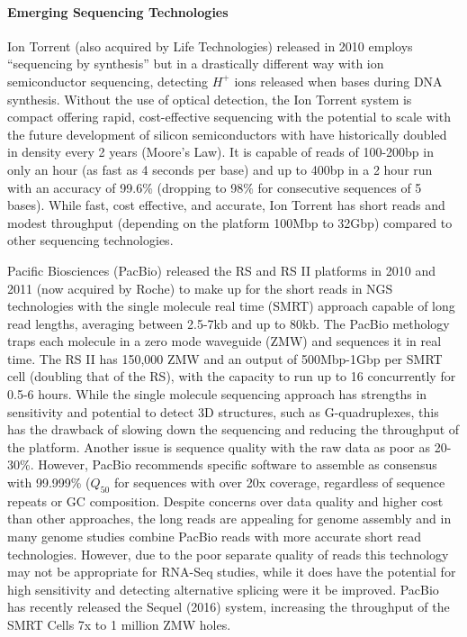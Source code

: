 \paragraph{Emerging Sequencing Technologies}

Ion Torrent (also acquired by Life Technologies) released in 2010 employs ``sequencing by synthesis'' but in a drastically different way with ion semiconductor sequencing, detecting $H^+$ ions released when bases during DNA synthesis. Without the use of optical detection, the Ion Torrent system is compact offering rapid, cost-effective sequencing with the potential to scale with the future development of silicon semiconductors with have historically doubled in density every 2 years (Moore's Law). It is capable of reads of 100-200bp in only an hour (as fast as 4 seconds per base) and up to 400bp in a 2 hour run with an accuracy of 99.6\% (dropping to 98\% for consecutive sequences of 5 bases). While fast, cost effective, and accurate, Ion Torrent has short reads and modest throughput (depending on the platform 100Mbp to 32Gbp) compared to other sequencing technologies.

Pacific Biosciences (PacBio) released the RS and RS II platforms in 2010 and 2011 (now acquired by Roche) to make up for the short reads in NGS technologies with the single molecule real time (SMRT) approach capable of long read lengths, averaging between 2.5-7kb and up to 80kb. The PacBio methology traps each molecule in a zero mode waveguide (ZMW) and sequences it in real time. The RS II has 150,000 ZMW and an output of 500Mbp-1Gbp per SMRT cell (doubling that of the RS), with the capacity to run up to 16 concurrently for 0.5-6 hours. While the single molecule sequencing approach has strengths in sensitivity and potential to detect 3D structures, such as G-quadruplexes, this has the drawback of slowing down the sequencing and reducing the throughput of the platform. Another issue is sequence quality with the raw data as poor as 20-30\%. However, PacBio recommends specific software to assemble as consensus with 99.999\% ($Q_{50}$ for sequences with over 20x coverage, regardless of sequence repeats or GC composition. Despite concerns over data quality and higher cost than other approaches, the long reads are appealing for genome assembly and in many genome studies combine PacBio reads with more accurate short read technologies. However, due to the poor separate quality of reads this technology may not be appropriate for RNA-Seq studies, while it does have the potential for high sensitivity and detecting alternative splicing were it be improved. PacBio has recently released the Sequel (2016) system, increasing the throughput of the SMRT Cells 7x to 1 million ZMW holes. 

